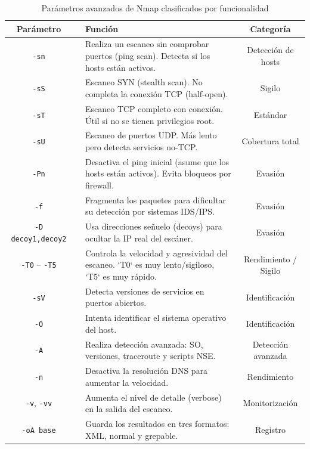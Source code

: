 \documentclass[a4paper, 11pt]{article}
\begin{document}
\vspace{1em}

\begin{table}[H]
\centering
\renewcommand{\arraystretch}{1.3}
\begin{tabularx}{\textwidth}{clXc}
\toprule
\textbf{Parámetro} & \textbf{} & \textbf{Función} & \textbf{Categoría} \\
\midrule
\bottomrule
\texttt{-sn} & & Realiza un escaneo sin comprobar puertos (ping scan). Detecta si los hosts están activos. & Detección de hosts \\
\bottomrule
\texttt{-sS} & & Escaneo SYN (stealth scan). No completa la conexión TCP (half-open). & Sigilo \\
\bottomrule
\texttt{-sT} & & Escaneo TCP completo con conexión. Útil si no se tienen privilegios root. & Estándar \\
\bottomrule
\texttt{-sU} & & Escaneo de puertos UDP. Más lento pero detecta servicios no-TCP. & Cobertura total \\
\bottomrule
\texttt{-Pn} & & Desactiva el ping inicial (asume que los hosts están activos). Evita bloqueos por firewall. & Evasión \\
\bottomrule
\texttt{-f}  & & Fragmenta los paquetes para dificultar su detección por sistemas IDS/IPS. & Evasión \\
\bottomrule
\texttt{-D decoy1,decoy2} & & Usa direcciones señuelo (decoys) para ocultar la IP real del escáner. & Evasión \\
\bottomrule
\texttt{-T0} -- \texttt{-T5} & & Controla la velocidad y agresividad del escaneo. `T0` es muy lento/sigiloso, `T5` es muy rápido. & Rendimiento / Sigilo \\
\bottomrule
\texttt{-sV} & & Detecta versiones de servicios en puertos abiertos. & Identificación \\
\bottomrule
\texttt{-O} & & Intenta identificar el sistema operativo del host. & Identificación \\
\bottomrule
\texttt{-A} & & Realiza detección avanzada: SO, versiones, traceroute y scripts NSE. & Detección avanzada \\
\bottomrule
\texttt{-n} & & Desactiva la resolución DNS para aumentar la velocidad. & Rendimiento \\
\bottomrule
\texttt{-v}, \texttt{-vv} & & Aumenta el nivel de detalle (verbose) en la salida del escaneo. & Monitorización \\
\bottomrule
\texttt{-oA base} & & Guarda los resultados en tres formatos: XML, normal y grepable. & Registro \\
\bottomrule
\end{tabularx}
\caption{Parámetros avanzados de Nmap clasificados por funcionalidad}
\label{tab:nmap_avanzado}
\end{table}
\end{document}
